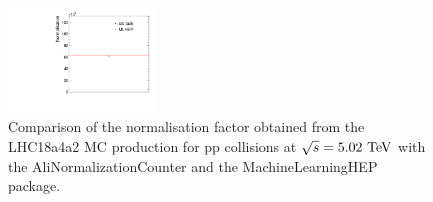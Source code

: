  \begin{figure}[tb]
\begin{center}
\includegraphics[width=0.35\textwidth]{figures/NormComparison.pdf}
\caption{Comparison of the normalisation factor obtained from the LHC18a4a2 MC production for pp collisions at $\sqrt{s}=5.02~\mathrm{TeV}$ with the AliNormalizationCounter and the MachineLearningHEP package.}
\label{fig:NormalisationComparisonMCpp} 
\end{center}
\end{figure}
